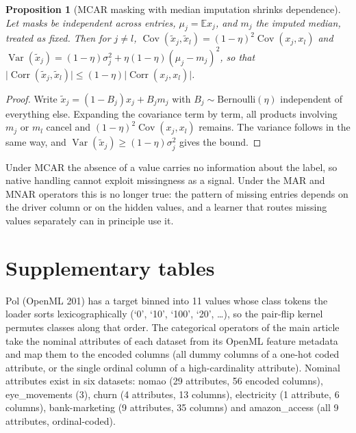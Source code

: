 \documentclass[pdflatex,sn-mathphys]{sn-jnl}
\theoremstyle{thmstyleone}
\newtheorem{supproposition}{Proposition}
\begin{document}
\begin{supproposition}[MCAR masking with median imputation shrinks dependence]\label{prop:s_mcar}
Let masks be independent across entries, $\mu_j=\mathbb{E}x_j$, and $m_j$ the imputed median, treated as fixed. Then for $j\neq l$, $\operatorname{Cov}(\tilde x_j,\tilde x_l)=(1-\eta)^{2}\operatorname{Cov}(x_j,x_l)$ and $\operatorname{Var}(\tilde x_j)=(1-\eta)\sigma_j^{2}+\eta(1-\eta)(\mu_j-m_j)^{2}$, so that $\lvert\operatorname{Corr}(\tilde x_j,\tilde x_l)\rvert\le(1-\eta)\lvert\operatorname{Corr}(x_j,x_l)\rvert$.
\end{supproposition}
\begin{proof}
Write $\tilde x_j=(1-B_j)x_j+B_jm_j$ with $B_j\sim\mathrm{Bernoulli}(\eta)$ independent of everything else. Expanding the covariance term by term, all products involving $m_j$ or $m_l$ cancel and $(1-\eta)^{2}\operatorname{Cov}(x_j,x_l)$ remains. The variance follows in the same way, and $\operatorname{Var}(\tilde x_j)\ge(1-\eta)\sigma_j^{2}$ gives the bound.
\end{proof}
Under MCAR the absence of a value carries no information about the label, so native handling cannot exploit missingness as a signal. Under the MAR and MNAR operators this is no longer true: the pattern of missing entries depends on the driver column or on the hidden values, and a learner that routes missing values separately can in principle use it.

\section{Supplementary tables}\label{sup:tables}





Pol (OpenML 201) has a target binned into 11 values whose class tokens the loader sorts lexicographically (`0', `10', `100', `20', \dots), so the pair-flip kernel permutes classes along that order. The categorical operators of the main article take the nominal attributes of each dataset from its OpenML feature metadata and map them to the encoded columns (all dummy columns of a one-hot coded attribute, or the single ordinal column of a high-cardinality attribute). Nominal attributes exist in six datasets: nomao (29 attributes, 56 encoded columns), eye\_movements (3), churn (4 attributes, 13 columns), electricity (1 attribute, 6 columns), bank-marketing (9 attributes, 35 columns) and amazon\_access (all 9 attributes, ordinal-coded).
\end{document}
